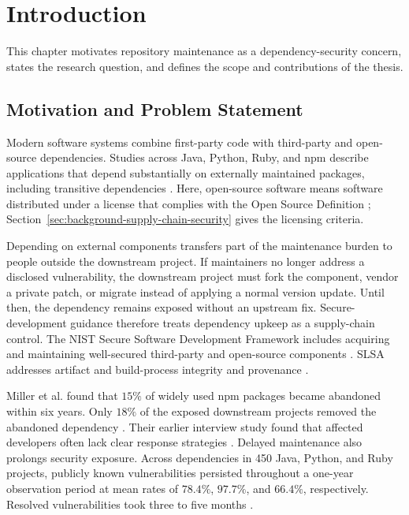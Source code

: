 \chapter{Introduction}
\label{chap:introduction}

This chapter motivates repository maintenance as a dependency-security concern,
states the research question, and defines the scope and contributions of the
thesis.

\section{Motivation and Problem Statement}
\label{sec:intro-motivation}

Modern software systems combine first-party code with third-party and
open-source dependencies. Studies across Java, Python, Ruby, and npm describe
applications that depend substantially on externally maintained packages,
including transitive dependencies
\cite{prana2021outsight,miller2025abandonment}. Here, open-source software means
software distributed under a license that complies with the Open Source
Definition \cite{osiOpenSourceDefinition}; Section~\ref{sec:background-supply-chain-security}
gives the licensing criteria.

Depending on external components transfers part of the maintenance burden to
people outside the downstream project. If maintainers no longer address a
disclosed vulnerability, the downstream project must fork the component, vendor
a private patch, or migrate instead of applying a normal version update. Until
then, the dependency remains exposed without an upstream fix.
Secure-development guidance therefore treats
dependency upkeep as a supply-chain control. The NIST Secure Software
Development Framework includes acquiring and maintaining well-secured
third-party and open-source components \cite{souppaya2022ssdf}. SLSA addresses
artifact and build-process integrity and provenance
\cite{slsa2025spec}.

Miller et al. found that \(15\%\) of widely used npm packages became abandoned
within six years. Only \(18\%\) of the exposed downstream projects removed the
abandoned dependency \cite{miller2025abandonment}. Their earlier interview study
found that affected developers often lack clear response strategies
\cite{miller2023wingingit}. Delayed maintenance also prolongs security exposure.
Across dependencies in 450 Java, Python, and Ruby projects, publicly known
vulnerabilities persisted throughout a one-year observation period at mean rates
of \(78.4\%\), \(97.7\%\), and \(66.4\%\), respectively. Resolved
vulnerabilities took three to five months \cite{prana2021outsight}.

